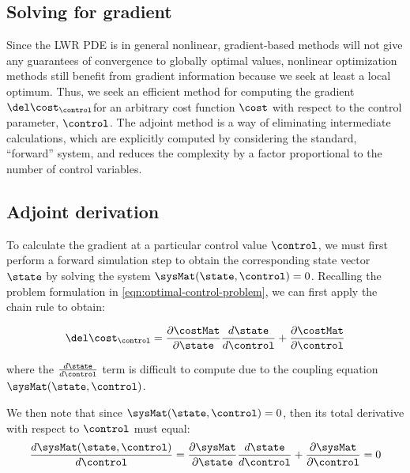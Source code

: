 \subsection{Solving for gradient} %
\label{sub:solving_for_gradient_in_deterministic_systems}

Since the LWR PDE is in general nonlinear, gradient-based methods will not give any guarantees of convergence to globally optimal values, nonlinear optimization methods still benefit from gradient information because we seek at least a local optimum.
Thus, we seek an efficient method for computing the gradient $\del \cost_{\control}$for an arbitrary cost function $\cost$ with respect to the control parameter, $\control$. The adjoint method is a way of eliminating intermediate calculations, which are explicitly computed by considering the standard, ``forward'' system, and reduces the complexity by a factor proportional to the number of control variables.



\subsection{Adjoint derivation} %
\label{sub:adjoint_derivation}

To calculate the gradient at a particular control value $\control$, we must first perform a forward simulation step to obtain the corresponding state vector $\state$ by solving the system $\sysMat(\state,\control) = 0$. Recalling the problem formulation in \eqref{eqn:optimal-control-problem}, we can first apply the chain rule to obtain:

\begin{equation}
    \label{eqn:chain-rule}
    \del \cost_{\control} = \djdx \dFrac{\state}{\control} +\djdu
\end{equation}

where the $\dFrac{\state}{\control}$ term is difficult to compute due to the coupling equation $\sysMat(\state,\control)$. 

We then note that since $\sysMat(\state,\control) = 0$, then its total derivative with respect to $\control$ must equal:
\begin{equation}
    \label{eqn:symat-deriv}
    \frac{d\sysMat(\state,\control)}{d\control} = \dhdx\dFrac{\state}{\control} + \dhdu = 0
\end{equation}

